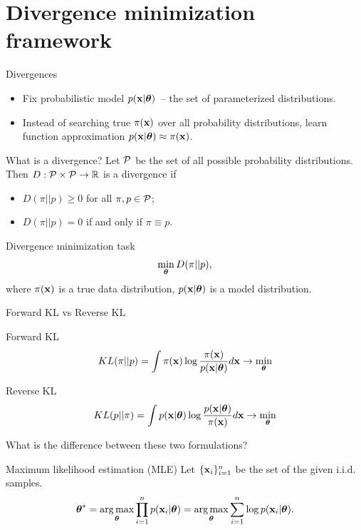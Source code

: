 \section{Divergence minimization framework}
\begin{frame}{Divergences}
	\begin{itemize}
	\item Fix probabilistic model $p(\mathbf{x} | \boldsymbol{\theta})$~-- the set of parameterized distributions. \\
	\item Instead of searching true $\pi(\mathbf{x})$ over all probability distributions, learn function approximation $p(\mathbf{x} | \boldsymbol{\theta}) \approx \pi(\mathbf{x})$.
	\end{itemize}
	\begin{block}{What is a divergence?}
		Let $\mathcal{P}$ be the set of all possible probability distributions. Then $D: \mathcal{P} \times \mathcal{P} \rightarrow \mathbb{R}$ is a divergence if 
		\begin{itemize}
			\item $D(\pi || p) \geq 0$ for all $\pi, p \in \mathcal{P}$;
			\item $D(\pi || p) = 0$ if and only if $\pi \equiv p$.
		\end{itemize}
	\end{block}
	\begin{block}{Divergence minimization task}
		\vspace{-0.3cm}
		\[
		\min_{\boldsymbol{\theta}} D(\pi || p),
		\]
		where $\pi(\mathbf{x})$ is a true data distribution, $p(\mathbf{x} | \boldsymbol{\theta})$ is a model distribution.
	\end{block}
\end{frame}
\begin{frame}{Forward KL vs Reverse KL}
	\begin{block}{Forward KL}
		\vspace{-0.2cm}
		\[
		KL(\pi || p) = \int \pi (\mathbf{x}) \log \frac{\pi(\mathbf{x})}{p(\mathbf{x} | \boldsymbol{\theta})} d \mathbf{x} \rightarrow \min_{\boldsymbol{\theta}}
		\]
	\end{block}
	\begin{block}{Reverse KL}
		\vspace{-0.2cm}
		\[
		KL(p || \pi) = \int p (\mathbf{x}| \boldsymbol{\theta}) \log \frac{p(\mathbf{x}| \boldsymbol{\theta})}{\pi(\mathbf{x})} d \mathbf{x} \rightarrow \min_{\boldsymbol{\theta}}
		\]
	\end{block}
	What is the difference between these two formulations?
	
	\begin{block}{Maximum likelihood estimation (MLE)}
	Let $\{\mathbf{x}_i\}_{i=1}^n$ be the set of the given i.i.d. samples.
		\vspace{-0.3cm}
		\[
		\boldsymbol{\theta}^* = \operatorname*{arg\,max}_{\boldsymbol{\theta}} \prod_{i=1}^n p(\mathbf{x}_i | \boldsymbol{\theta}) = \operatorname*{arg\,max}_{\boldsymbol{\theta}} \sum_{i=1}^n \log p(\mathbf{x}_i | \boldsymbol{\theta}).
		\]
	\end{block}
\end{frame}
